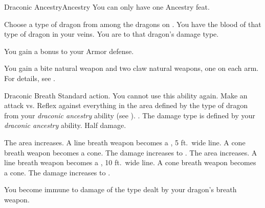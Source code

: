    \begin{feat}{Draconic Ancestry}{Ancestry}
         You can only have one Ancestry feat.

         Choose a type of dragon from among the dragons on .
        You have the blood of that type of dragon in your veins.
        You are  to that dragon's damage type.

         You gain a  bonus to your Armor defense.

         You gain a bite natural weapon and two claw natural weapons, one on each arm.
        For details, see .

        \begin{activeability}{Draconic Breath}
            \abilityusagetime Standard action.
            \abilitycost You  cannot use this ability again.
            \rankline
            Make an attack vs. Reflex against everything in the area defined by the type of dragon from your \textit{draconic ancestry} ability (see ).
            \hit \damagerankthree{}.
            The damage type is defined by your \textit{draconic ancestry} ability.
            \miss Half damage.

            \rankline
             The area increases.
                A line breath weapon becomes a \arealarge, 5 ft.\ wide line.
                A cone breath weapon becomes a \areamed cone.
             The damage increases to \damagerankfive{}.
             The area increases.
                A line breath weapon becomes a \areahuge, 10 ft.\ wide line.
                A cone breath weapon becomes a \arealarge cone.
             The damage increases to \damagerankseven{}.
        \end{activeability}

         You become immune to damage of the type dealt by your dragon's breath weapon.


\end{feat}
